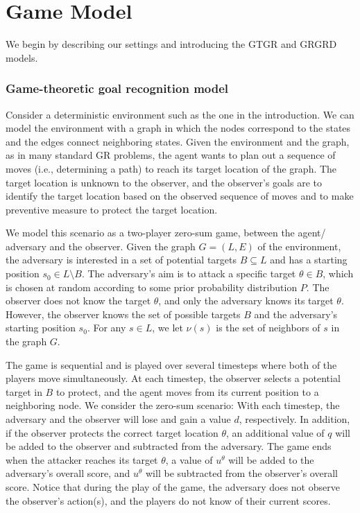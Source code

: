 %
%
\chapter{Game Model}
We begin by describing our settings and introducing the  
GTGR and GRGRD models. 

\subsection{Game-theoretic goal recognition model}\label{sec:game_basic}
Consider a deterministic environment such as the one in the introduction. 
We can model the environment with a graph 
in which the nodes correspond to the states  
and the edges connect neighboring states. 
Given the environment and the graph, as in many standard GR problems, 
the agent wants to plan out a sequence of moves (i.e., determining a path) 
to reach its target location of the graph.
The target location is unknown to the observer, and the observer's
goals are to identify the target location based on the observed sequence of moves 
and to make preventive measure to protect the target location. 

We model this scenario as a two-player zero-sum game, between the agent/ adversary
and the observer. Given the graph $G = (L, E)$ of the environment, 
the adversary is interested in a set of potential targets $B \subseteq L$ 
and has a starting position $s_0 \in L \setminus B$. 
The adversary's aim is to attack a specific target $\theta \in B$, which 
is chosen at random according to some prior probability distribution $P$. 
The observer does not know the target $\theta$, and only the adversary knows its target $\theta$.  
However, the observer knows the set of possible targets $B$ and the adversary's starting position $s_0$. 
For any $s \in L$, we let $\nu(s)$ is the set of neighbors of $s$ in the graph $G$. 

The game is sequential and is played over several timesteps 
where both of the players move simultaneously. 
At each timestep, the observer selects a potential target in $B$ to protect, 
and the agent moves from its current position to a neighboring node.
We consider the zero-sum scenario: With each timestep, 
the adversary and the observer will lose and gain a value $d$, respectively.
In addition, if the observer protects the correct target location $\theta$,
an additional value of $q$ will be added to the observer 
and subtracted from the adversary. 
The game ends when the attacker reaches its target $\theta$, 
a value of $u^{\theta}$ will be added to the adversary's overall score, and $u^{\theta}$ will be subtracted 
from the observer's overall score. 
Notice that during the play of the game, the adversary does not observe 
the observer's action(s), and the players do not know of their current scores. 

